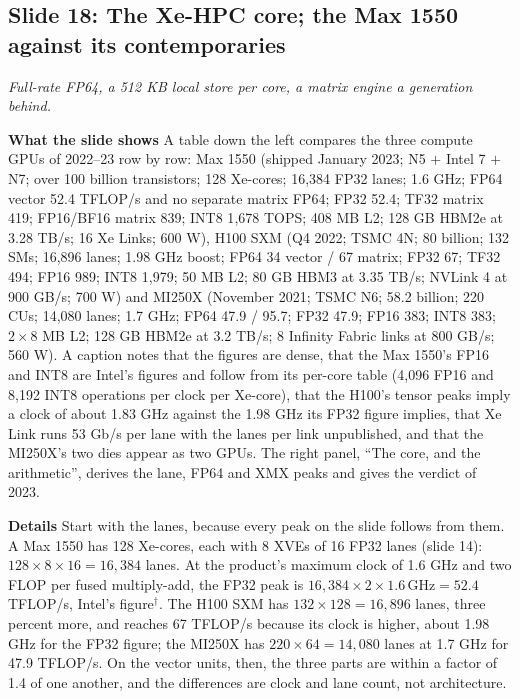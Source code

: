 \documentclass[11pt,letterpaper]{article}
\newcommand{\slide}[3]{%
  \subsection[Slide #1: #2]{Slide #1: #2}%
  {\color{muted}\itshape #3\par}\medskip}
\newcommand{\para}[1]{\medskip\noindent\textbf{#1}\quad}
\begin{document}
\slide{18}{The Xe-HPC core; the Max 1550 against its contemporaries}{Full-rate FP64, a 512 KB local store per core, a matrix engine a generation behind.}

\para{What the slide shows} A table down the left compares the three compute GPUs of 2022--23 row by row: Max 1550 (shipped January 2023; N5 $+$ Intel 7 $+$ N7; over 100 billion transistors; 128 Xe-cores; 16{,}384 FP32 lanes; 1.6 GHz; FP64 vector 52.4 TFLOP/s and no separate matrix FP64; FP32 52.4; TF32 matrix 419; FP16/BF16 matrix 839; INT8 1{,}678 TOPS; 408 MB L2; 128 GB HBM2e at 3.28 TB/s; 16 Xe Links; 600 W), H100 SXM (Q4 2022; TSMC 4N; 80 billion; 132 SMs; 16{,}896 lanes; 1.98 GHz boost; FP64 34 vector / 67 matrix; FP32 67; TF32 494; FP16 989; INT8 1{,}979; 50 MB L2; 80 GB HBM3 at 3.35 TB/s; NVLink 4 at 900 GB/s; 700 W) and MI250X (November 2021; TSMC N6; 58.2 billion; 220 CUs; 14{,}080 lanes; 1.7 GHz; FP64 47.9 / 95.7; FP32 47.9; FP16 383; INT8 383; $2 \times 8$ MB L2; 128 GB HBM2e at 3.2 TB/s; 8 Infinity Fabric links at 800 GB/s; 560 W). A caption notes that the figures are dense, that the Max 1550's FP16 and INT8 are Intel's figures and follow from its per-core table (4{,}096 FP16 and 8{,}192 INT8 operations per clock per Xe-core), that the H100's tensor peaks imply a clock of about 1.83 GHz against the 1.98 GHz its FP32 figure implies, that Xe Link runs 53 Gb/s per lane with the lanes per link unpublished, and that the MI250X's two dies appear as two GPUs. The right panel, ``The core, and the arithmetic'', derives the lane, FP64 and XMX peaks and gives the verdict of 2023.

\para{Details} Start with the lanes, because every peak on the slide follows from them. A Max 1550 has 128 Xe-cores, each with 8 XVEs of 16 FP32 lanes (slide 14): $128 \times 8 \times 16 = 16{,}384$ lanes. At the product's maximum clock of 1.6 GHz and two FLOP per fused multiply-add, the FP32 peak is $16{,}384 \times 2 \times 1.6\,\text{GHz} = 52.4$ TFLOP/s, Intel's figure$^\dagger$. The H100 SXM has $132 \times 128 = 16{,}896$ lanes, three percent more, and reaches 67 TFLOP/s because its clock is higher, about 1.98 GHz for the FP32 figure; the MI250X has $220 \times 64 = 14{,}080$ lanes at 1.7 GHz for 47.9 TFLOP/s. On the vector units, then, the three parts are within a factor of 1.4 of one another, and the differences are clock and lane count, not architecture.
\end{document}
